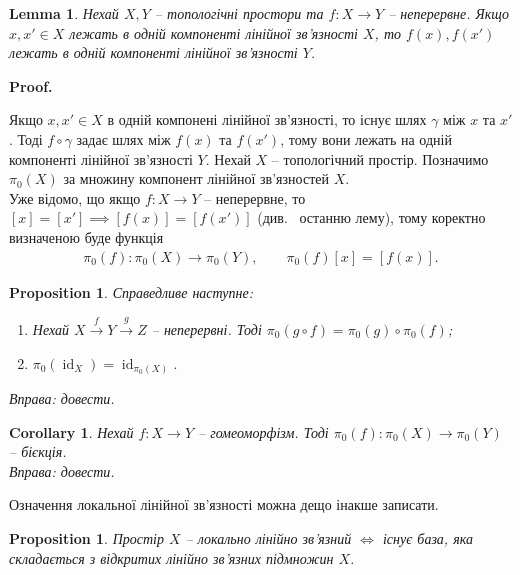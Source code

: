 \documentclass[a4paper, 10pt]{article}
\makeatletter
\theoremstyle{theoremdd}
\newtheorem{proposition}[theorem]{Proposition}
\newtheorem{lemma}[theorem]{Lemma}
\newtheorem{corollary}[theorem]{Corollary}
\DeclareMathOperator{\id}{id}
\renewenvironment{proof}[1][Proof.\\]{\par
\pushQED{\hfill \qed}%
\normalfont \topsep6\p@\@plus6\p@\relax
\trivlist
\item\relax
{\bfseries
#1\@addpunct{.}}\hspace\labelsep\ignorespaces
}{%
\popQED\endtrivlist\@endpefalse
}
\makeatother
\begin{document}
\begin{lemma}
Нехай $X,Y$ -- топологічні простори та $f \colon X \to Y$ -- неперервне. Якщо $x,x' \in X$ лежать в одній компоненті лінійної зв'язності $X$, то $f(x),f(x')$ лежать в одній компоненті лінійної зв'язності $Y$.
\end{lemma}

\begin{proof}
Якщо $x,x' \in X$ в одній компонені лінійної зв'язності, то існує шлях $\gamma$ між $x$ та $x'$. Тоді $f \circ \gamma$ задає шлях між $f(x)$ та $f(x')$, тому вони лежать на одній компоненті лінійної зв'язності $Y$.
\end{proof}
\noindent
Нехай $X$ -- топологічний простір. Позначимо $\pi_0(X)$ за множину компонент лінійної зв'язностей $X$.\\
Уже відомо, що якщо $f \colon X \to Y$ -- неперервне, то $[x] = [x'] \implies [f(x)] = [f(x')]$ (див.~ останню лему), тому коректно визначеною буде функція
\begin{align*}
\pi_0(f) \colon \pi_0(X) \to \pi_0(Y), \qquad \pi_0(f)[x] = [f(x)].
\end{align*}

\begin{proposition}
Справедливе наступне:
\begin{enumerate}[nosep,wide=0pt,label={\arabic*)}]
\item Нехай $X \overset{f}{\to} Y \overset{g}{\to} Z$ -- неперервні. Тоді $\pi_0(g \circ f) = \pi_0(g) \circ \pi_0(f)$;
\item $\pi_0(\id_X) = \id_{\pi_0(X)}$.
\end{enumerate}
\textit{Вправа: довести.}
\end{proposition}

\begin{corollary}
Нехай $f \colon X \to Y$ -- гомеоморфізм. Тоді $\pi_0(f) \colon \pi_0(X) \to \pi_0(Y)$ -- бієкція.\\
\textit{Вправа: довести.}
\end{corollary}

\noindent
Означення локальної лінійної зв'язності можна дещо інакше записати.
\begin{proposition}
Простір $X$ -- локально лінійно зв'язний $\iff$ існує база, яка складається з відкритих лінійно зв'язних підмножин $X$.  
\end{proposition}
\end{document}
